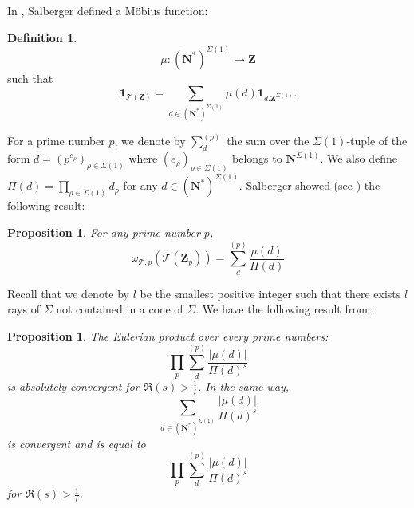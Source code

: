 \documentclass{proc-l}
\newcommand{\Z}{\mathbf{Z}}
\newcommand{\N}{\mathbf{N}}
\newcommand{\stackT}{\mathcal{T}}
\newcommand{\w}{\omega}
\newtheorem{prop}[theorem]{Proposition}
\theoremstyle{definition}
\newtheorem{definition}[theorem]{Definition}
\theoremstyle{remark}
\numberwithin{equation}{section}
\begin{document}
In  \cite[definition 11.9]{salberger_torsor}, Salberger defined a Möbius function:
\begin{definition}\label{mobius_function_definition}
   $$\mu : (\N^*)^{\Sigma(1)} \rightarrow \Z$$such that $$ \mathbf{1}_{\stackT(\Z)} = \sum\limits_{d \in (\N^*)^{\Sigma(1)}} \mu(d) \mathbf{1}_{d.\Z^{\Sigma(1)}} .$$ 
\end{definition}

For a prime number $p$, we denote by $\sum\limits_{d}^{(p)}$ the sum over the $\Sigma(1)$-tuple of the form $d = (p^{e_{\rho}})_{\rho \in \Sigma(1)}$ where $(e_{\rho})_{\rho \in \Sigma(1)}$ belongs to $\N^{\Sigma(1)}$. We also define $\Pi(d) = \prod\limits_{\rho \in \Sigma(1)} d_{\rho}$ for any $d \in (\N^*)^{\Sigma(1)}$. Salberger showed (see \cite[11.14]{salberger_torsor}) the following result:

\begin{prop}\label{value_local_mesure_mobius_function}
For any prime number $p$,
    $$\w_{\stackT,p}(\stackT(\Z_p)) =  \sum\limits_{d}^{(p)} \frac{\mu(d)}{\Pi(d)}$$
\end{prop}


Recall that we denote by $l$ be the smallest positive integer such that there exists $l$ rays of $\Sigma$ not contained in a cone of $\Sigma$. We have the following result from \cite[lemma 11.15]{salberger_torsor}:


\begin{prop}\label{value_global_mesure_mobius_fonction}
    The Eulerian product over every prime numbers:
    $$\prod\limits_p \sum\limits_{d}^{(p)} \frac{|\mu(d)|}{\Pi(d)^s}$$is absolutely convergent for $\Re(s) > \frac{1}{l}$. In the same way, $$\sum\limits_{d \in (\N^*)^{\Sigma(1)}} \frac{| \mu(d) |}{\Pi(d)^s} $$ is convergent and is equal to $$\prod\limits_p \sum\limits_{d}^{(p)} \frac{|\mu(d)|}{\Pi(d)^s}$$for $\Re(s) > \frac{1}{l}$.
\end{prop}
\end{document}
